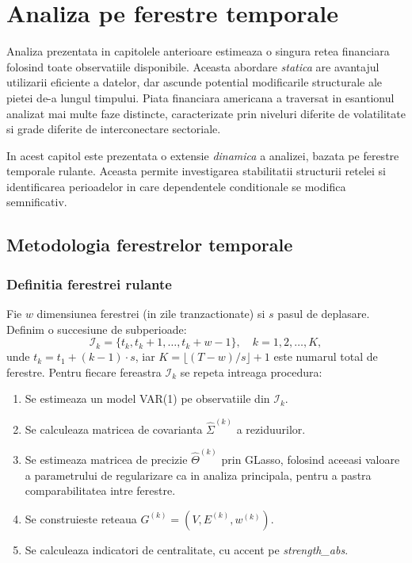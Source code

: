 \chapter{Analiza pe ferestre temporale}

Analiza prezentata in capitolele anterioare estimeaza o singura retea financiara
folosind toate observatiile disponibile. Aceasta abordare \textit{statica} are
avantajul utilizarii eficiente a datelor, dar ascunde potential modificarile
structurale ale pietei de-a lungul timpului. Piata financiara americana a traversat in esantionul analizat mai multe faze distincte, caracterizate prin niveluri diferite
de volatilitate si grade diferite de interconectare sectoriale.

In acest capitol este prezentata o extensie \textit{dinamica} a analizei, bazata
pe ferestre temporale rulante. Aceasta permite investigarea stabilitatii structurii
retelei si identificarea perioadelor in care dependentele conditionale se modifica
semnificativ.

\section{Metodologia ferestrelor temporale}

\subsection{Definitia ferestrei rulante}

Fie $w$ dimensiunea ferestrei (in zile tranzactionate) si $s$ pasul de deplasare.
Definim o succesiune de subperioade:
\begin{equation}
    \mathcal{I}_k = \{t_k, t_k + 1, \ldots, t_k + w - 1\}, \quad k = 1, 2, \ldots, K,
    \label{eq:window}
\end{equation}
unde $t_k = t_1 + (k-1) \cdot s$, iar $K = \lfloor (T - w)/s \rfloor + 1$ este
numarul total de ferestre. Pentru fiecare fereastra $\mathcal{I}_k$ se repeta
intreaga procedura:
\begin{enumerate}
    \item Se estimeaza un model VAR(1) pe observatiile din $\mathcal{I}_k$.
    \item Se calculeaza matricea de covarianta $\hat{\Sigma}^{(k)}$ a reziduurilor.
    \item Se estimeaza matricea de precizie $\hat{\Theta}^{(k)}$ prin GLasso,
    folosind aceeasi valoare a parametrului de regularizare ca in analiza
    principala, pentru a pastra comparabilitatea intre ferestre.
    \item Se construieste reteaua $G^{(k)} = (V, E^{(k)}, w^{(k)})$.
    \item Se calculeaza indicatori de centralitate, cu accent pe
    \textit{strength\_abs}.
\end{enumerate}


